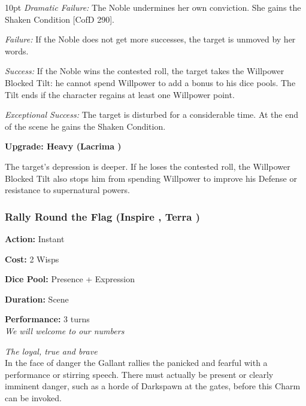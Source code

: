\begin{myindentpar}{10pt}    \emph{Dramatic Failure:}  The Noble undermines her own conviction. She gains the Shaken Condition [CofD 290].

    \emph{Failure:}  If the Noble does not get more successes, the target is unmoved by her words.

    \emph{Success:} If the Noble wins the contested roll, the target takes the Willpower Blocked Tilt: he cannot spend Willpower to add a bonus to his dice pools. The Tilt ends if the character regains at least one Willpower point.

    \emph{Exceptional Success:}  The target is disturbed for a considerable time. At the end of the scene he gains the Shaken Condition.
	
	\textbf{Upgrade: Heavy (Lacrima \textbullet\textbullet\textbullet)}

	The target’s depression is deeper. If he loses the contested roll, the Willpower Blocked Tilt also stops him from spending Willpower to improve his Defense or resistance to supernatural powers.\end{myindentpar}
	
\subsubsection*{Rally Round the Flag (Inspire \textbullet\textbullet, Terra \textbullet\textbullet\textbullet)}

\noindent \textbf{Action:} Instant

\noindent \textbf{Cost:} 2 Wisps

\noindent \textbf{Dice Pool:} Presence + Expression

\noindent \textbf{Duration:} Scene

\noindent \textbf{Performance:} 3 turns \\	

\textit{We will welcome to our numbers}

\textit{The loyal, true and brave} \\

In the face of danger the Gallant rallies the panicked and fearful with a performance or stirring speech. There must actually be present or clearly imminent danger, such as a horde of Darkspawn at the gates, before this Charm can be invoked. 

